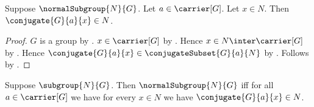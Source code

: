 \begin{proposition}\label{normal_subgroup_closed_under_conjugation}
    Suppose $\normalSubgroup{N}{G}$.
    Let $a\in\carrier[G]$.
    Let $x\in N$.
    Then $\conjugate{G}{a}{x}\in N$.
\end{proposition}
\begin{proof}
    $G$ is a group by .
    $x\in\carrier[G]$ by
        .
    Hence $x\in N\inter\carrier[G]$ by .
    Hence $\conjugate{G}{a}{x}\in\conjugateSubset{G}{a}{N}$ by
        .
    Follows by .
\end{proof}

\begin{theorem}\label{normal_subgroup_iff_closed_under_conjugation}
    Suppose $\subgroup{N}{G}$.
    Then $\normalSubgroup{N}{G}$ iff
        for all $a\in\carrier[G]$ we have for every $x\in N$ we have
            $\conjugate{G}{a}{x}\in N$.
\end{theorem}

